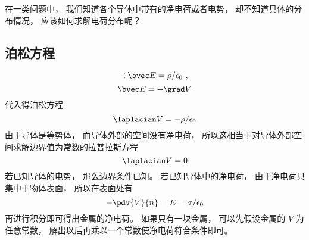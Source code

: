 
\begin{issues}
\issueDraft
\end{issues}

在一类问题中， 我们知道各个导体中带有的净电荷或者电势， 却不知道具体的分布情况， 应该如何求解电荷分布呢？

\subsection{泊松方程}
\begin{equation}
\div \bvec E = \rho/\epsilon_0~,
\end{equation}
\begin{equation}
\bvec E = -\grad V
\end{equation}
代入得泊松方程
\begin{equation}
\laplacian V = -\rho/\epsilon_0
\end{equation}
由于导体是等势体， 而导体外部的空间没有净电荷， 所以这相当于对导体外部空间求解边界值为常数的拉普拉斯方程
\begin{equation}
\laplacian V = 0
\end{equation}
若已知导体的电势， 那么边界条件已知。 若已知导体中的净电荷， 由于净电荷只集中于物体表面， 所以在表面处有
\begin{equation}
-\pdv{V}{n} = E = \sigma/\epsilon_0
\end{equation}
再进行积分即可得出金属的净电荷。 如果只有一块金属， 可以先假设金属的 $V$ 为任意常数， 解出以后再乘以一个常数使净电荷符合条件即可。


